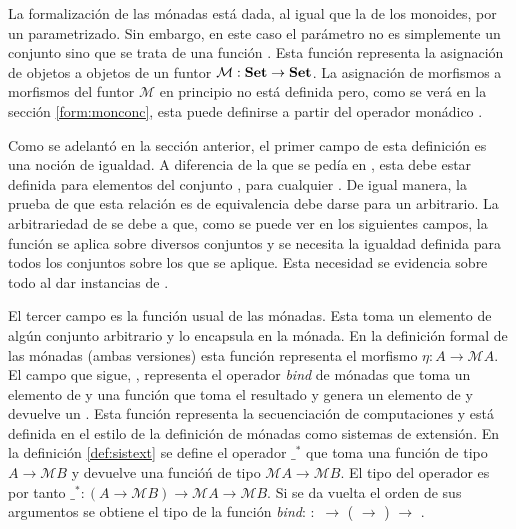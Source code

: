La formalización de las mónadas está dada, al igual que la de los monoides, por un  parametrizado. Sin embargo, en este caso el parámetro no es simplemente un conjunto sino que se trata de una función  \AgdaSymbol{:}  \AgdaSymbol{$\rightarrow$} . Esta función representa la asignación de objetos a objetos de un funtor $\mathcal{M} : \text{\bf Set} \rightarrow \text{\bf Set}$. La asignación de morfismos a morfismos del funtor $\mathcal{M}$ en principio no está definida pero, como se verá en la sección \ref{form:monconc}, esta puede definirse a partir del operador monádico \AgdaField{$\gg=$}.


Como se adelantó en la sección anterior, el primer campo de esta definición es una noción de igualdad. A diferencia de la que se pedía en , esta debe estar definida para elementos del conjunto , para cualquier . De igual manera, la prueba de que esta relación es de equivalencia debe darse para un  arbitrario. La arbitrariedad de  se debe a que, como se puede ver en los siguientes campos, la función  se aplica sobre diversos conjuntos y se necesita la igualdad definida para todos los conjuntos sobre los que  se aplique. Esta necesidad se evidencia sobre todo al dar instancias de .

El tercer campo es la función  usual de las mónadas. Esta toma un elemento de algún conjunto  arbitrario y lo encapsula en la mónada. En la definición formal de las mónadas (ambas versiones) esta función representa el morfismo $\eta : A \rightarrow \mathcal{M} A$. El campo que sigue, \AgdaField{$\_\gg=\_$}, representa el operador \textit{bind} de mónadas que toma un elemento de  y una función que toma el resultado  y genera un elemento de  y devuelve un . Esta función representa la secuenciación de computaciones y está definida en el estilo de la definición de mónadas como sistemas de extensión. En la definición \ref{def:sistext} se define el operador $\_^*$ que toma una función de tipo $A \rightarrow \mathcal{M} B$ y devuelve una funcióń de tipo $\mathcal{M} A \rightarrow \mathcal{M} B$. El tipo del operador es por tanto $\_^* : (A \rightarrow \mathcal{M} B) \rightarrow \mathcal{M} A \rightarrow \mathcal{M} B$. Si se da vuelta el orden de sus argumentos se obtiene el tipo de la función \textit{bind}: \AgdaField{$\_\gg=\_$} $:$  $\rightarrow$ ( $\rightarrow$ ) $\rightarrow$ . 

